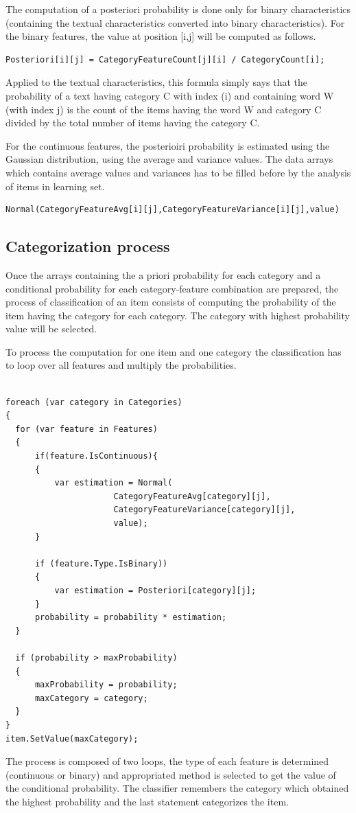The computation of a posteriori probability is done only for binary characteristics (containing the textual characteristics converted into binary characteristics).
For the binary features, the value at position [i,j] will be computed as follows.
\begin{verbatim}
Posteriori[i][j] = CategoryFeatureCount[j][i] / CategoryCount[i];
\end{verbatim}
Applied to the textual characteristics, this formula simply says that the probability of a text having category C with index (i) and containing word W (with index j) is the count of the items having the word W and category C divided by the total number of items having the category C.

For the continuous features, the posterioiri probability is estimated using the Gaussian distribution, using the average and variance values. The data arrays which contains average values and variances has to be filled before by the analysis of items in learning set. 

\begin{verbatim}
Normal(CategoryFeatureAvg[i][j],CategoryFeatureVariance[i][j],value)
\end{verbatim}

\subsection{Categorization process}
Once the arrays containing the a priori probability for each category and a conditional probability for each category-feature combination are prepared, the process of classification of an item consists of computing the probability of the item having the category for each category. The category with highest probability value will be selected.

To process the computation for one item and one category the classification has to loop over all features and multiply the probabilities.

\begin{verbatim}

foreach (var category in Categories)
{
  for (var feature in Features)
  {
      if(feature.IsContinuous){
      {
          var estimation = Normal( 
          			  CategoryFeatureAvg[category][j],
          			  CategoryFeatureVariance[category][j],
          			  value);
      }

      if (feature.Type.IsBinary))
      {
          var estimation = Posteriori[category][j];
      }
      probability = probability * estimation;
  }

  if (probability > maxProbability)
  {
      maxProbability = probability;
      maxCategory = category;
  }
}
item.SetValue(maxCategory);

\end{verbatim}
The process is composed of two loops, the type of each feature is determined (continuous or binary) and appropriated method is selected to get the value of the conditional probability. The classifier remembers the category which obtained the highest probability and the last statement categorizes the item.


